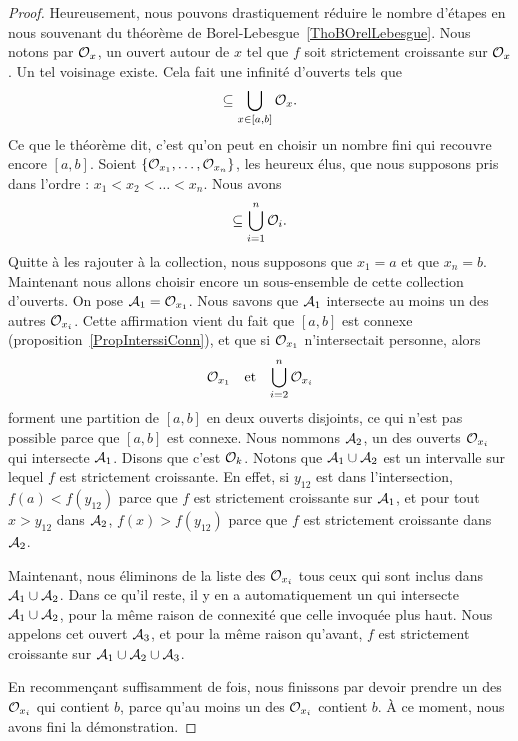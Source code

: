 \begin{proof}
    Heureusement, nous pouvons drastiquement réduire le nombre d'étapes en nous souvenant du théorème de Borel-Lebesgue~\ref{ThoBOrelLebesgue}. Nous notons par $\mathcal{O}_x$, un ouvert autour de $x$ tel que $f$ soit strictement croissante sur $\mathcal{O}_x$. Un tel voisinage existe. Cela fait une infinité d'ouverts tels que
    \begin{equation}
        [a,b]\subseteq\bigcup_{x\in[a,b]}\mO_x.
    \end{equation}
    Ce que le théorème dit, c'est qu'on peut en choisir un nombre fini qui recouvre encore $[a,b]$. Soient $\{ \mathcal{O}_{x_1},\ldots,\mathcal{O}_{x_n} \}$, les heureux élus, que nous supposons pris dans l'ordre : $x_1<x_2<\ldots<x_n$. Nous avons
    \begin{equation}
        [a,b]\subseteq\bigcup_{i=1}^n\mO_i.
    \end{equation}
    Quitte à les rajouter à la collection, nous supposons que $x_1=a$ et que $x_n=b$. Maintenant nous allons choisir encore un sous-ensemble de cette collection d'ouverts. On pose $\mathcal{A}_1=\mathcal{O}_{x_1}$. Nous savons que $\mathcal{A}_1$ intersecte au moins un des autres $\mathcal{O}_{x_i}$. Cette affirmation vient du fait que $[a,b]$ est connexe (proposition~\ref{PropInterssiConn}), et que si $\mathcal{O}_{x_1}$ n'intersectait personne, alors
    \begin{equation}
        \begin{aligned}[]
            \mO_{x_1}&&\text{et}&&\bigcup_{i=2}^n\mO_{x_i}
        \end{aligned}
    \end{equation}
    forment une partition de $[a,b]$ en deux ouverts disjoints, ce qui n'est pas possible parce que $[a,b]$ est connexe. Nous nommons $\mathcal{A}_2$, un des ouverts $\mathcal{O}_{x_i}$ qui intersecte $\mathcal{A}_1$. Disons que c'est $\mathcal{O}_k$. Notons que $\mathcal{A}_1\cup\mathcal{A}_2$ est un intervalle sur lequel $f$ est strictement croissante. En effet, si $y_{12}$ est dans l'intersection, $f(a)<f(y_{12})$ parce que $f$ est strictement croissante sur $\mathcal{A}_1$, et pour tout $x>y_{12}$ dans $\mathcal{A}_2$, $f(x)>f(y_{12})$ parce que $f$ est strictement croissante dans $\mathcal{A}_2$.

    Maintenant, nous éliminons de la liste des $\mathcal{O}_{x_i}$ tous ceux qui sont inclus dans $\mathcal{A}_1\cup\mathcal{A}_2$. Dans ce qu'il reste, il y en a automatiquement un qui intersecte $\mathcal{A}_1\cup\mathcal{A}_2$, pour la même raison de connexité que celle invoquée plus haut. Nous appelons cet ouvert $\mathcal{A}_3$, et pour la même raison qu'avant, $f$ est strictement croissante sur $\mathcal{A}_1\cup\mathcal{A}_2\cup\mathcal{A}_3$.

    En recommençant suffisamment de fois, nous finissons par devoir prendre un des $\mathcal{O}_{x_i}$ qui contient $b$, parce qu'au moins un des $\mathcal{O}_{x_i}$ contient $b$. À ce moment, nous avons fini la démonstration.
\end{proof}

